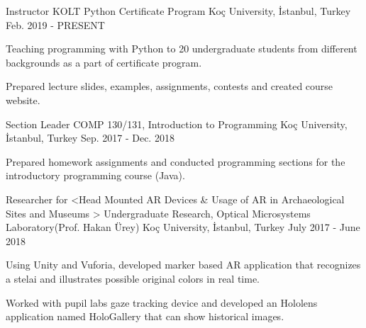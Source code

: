
\vspace*{-1.5mm}
\begin{cventries}

  \cventry
    {Instructor}
    {KOLT Python Certificate Program}
    {Koç University, İstanbul, Turkey}
    {Feb. 2019 - PRESENT}
    {
      \begin{cvitems}
        \item {Teaching programming with Python to 20 undergraduate students from different backgrounds as a part of certificate program.}
        \item {Prepared lecture slides, examples, assignments, contests and created course website.}
      \end{cvitems}
    }

  \cventry
    {Section Leader}%
    {COMP 130/131, Introduction to Programming}%
    {Koç University, İstanbul, Turkey}
    {Sep. 2017 - Dec. 2018}
    {
      \begin{cvitems}
        \item {Prepared homework assignments and conducted programming sections for the introductory programming course (Java).}
      \end{cvitems}
    }


  \cventry
    {Researcher for <Head Mounted AR Devices \& Usage of AR in Archaeological Sites and Museums >}%
     {Undergraduate Research, Optical Microsystems Laboratory(Prof. Hakan Ürey)}%
    {Koç University, İstanbul, Turkey}
    {July 2017 - June 2018}
    {
      \begin{cvitems} 
        \item {Using Unity and Vuforia, developed marker based AR application that recognizes a stelai and illustrates possible original colors in real time.}
	      \item {Worked with pupil labs gaze tracking device and developed an Hololens application named HoloGallery that can show historical images.}
      \end{cvitems} 
    }

\end{cventries}
